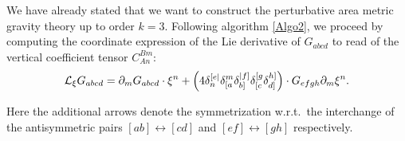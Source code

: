 We have already stated that we want to construct the perturbative area metric gravity theory up to order $k=3$. Following algorithm \ref{Algo2}, we proceed by computing the coordinate expression of the Lie derivative of $G_{abcd}$ to read of the vertical coefficient tensor $C_{An}^{Bm}$:
\begin{align}\label{LieArea}
    \mathcal{L}_{\xi} G_{abcd} = \partial_m G_{abcd} \cdot \xi^n + \left (4 \delta_n^{[e\vert} \delta_{[\mathnode{a}}^m \delta_{b]}^{\vert \mathnode{f} ]} \delta_{[c}^{[g} \delta_{\mathnode{d}]}^{\mathnode{h}]} \right ) \cdot G_{efgh} \partial_m \xi^n.
\end{align}

Here the additional arrows denote the symmetrization w.r.t.\ the interchange of the antisymmetric pairs $[ab] \leftrightarrow [cd]$ and $[ef] \leftrightarrow [gh]$ respectively.

